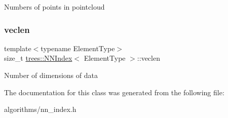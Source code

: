 Numbers of points in pointcloud \mbox{\label{classtrees_1_1_n_n_index_a3da4f85f9618451a8f7d27301fb6ac8c}} 
\subsubsection{\texorpdfstring{veclen}{veclen}}
{\footnotesize\ttfamily template$<$typename Element\+Type$>$ \\
size\+\_\+t \hyperlink{classtrees_1_1_n_n_index}{trees\+::\+N\+N\+Index}$<$ Element\+Type $>$\+::veclen\hspace{0.3cm}{\ttfamily [protected]}}

Number of dimensions of data 

The documentation for this class was generated from the following file\+:\begin{DoxyCompactItemize}
\item 
algorithms/nn\+\_\+index.\+h\end{DoxyCompactItemize}
